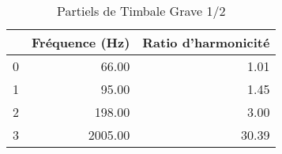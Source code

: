 \begin{table}
\centering
\caption{Partiels de Timbale Grave 1/2}
\label{table:partiels-timbale-grave-2.wav}
\begin{tabular}{lrr}
\toprule
{} &  Fréquence (Hz) &  Ratio d'harmonicité \\
\midrule
0 &           66.00 &                 1.01 \\
1 &           95.00 &                 1.45 \\
2 &          198.00 &                 3.00 \\
3 &         2005.00 &                30.39 \\
\bottomrule
\end{tabular}
\end{table}
